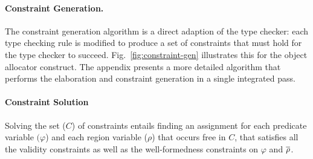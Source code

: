 

\paragraph{Constraint Generation.}
The constraint generation algorithm is a direct adaption of the type checker:
each type checking rule is modified to produce a set of constraints that must hold
for the type checker to succeed.
%
Fig.~\ref{fig:constraint-gen} illustrates this for the object allocator  construct.
%
The appendix presents a more detailed algorithm that performs the elaboration and
constraint generation in a single integrated pass.

\paragraph{Constraint Solution}
Solving the set ($C$) of constraints entails finding an
assignment for each predicate variable $(\varphi$) and each region
variable ($\rho$) that occurs free in $C$, that satisfies all
the validity constraints as well as the well-formedness constraints on
$\varphi$ and $\overline{\rho}$.

